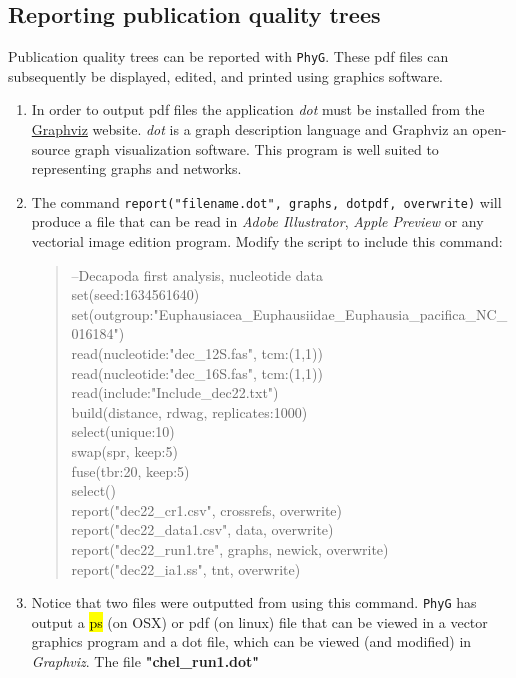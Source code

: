 \documentclass[11pt]{article}
\newcommand{\phyg}{\texttt{PhyG} }
\begin{document}
\subsection{Reporting publication quality trees}
\label{subsec:dotpdf}

Publication quality trees can be reported with \texttt{PhyG}. These pdf files can  
subsequently be displayed, edited, and printed using graphics software.

\begin{enumerate}

\item In order to output pdf files the application \emph{dot} must be installed from 
the \href{https://graphviz.org/download/}{Graphviz} website. \emph{dot} is a graph 
description language and Graphviz an  open-source graph visualization software. 
This program is well suited to representing graphs and networks.

\item  The command \texttt{report("filename.dot", graphs, dotpdf, overwrite)} will 
produce a file that can be read in \emph{Adobe Illustrator}, \emph{Apple Preview} 
or any vectorial image edition program. Modify the script to include this command:

	\begin{quote}	
	--Decapoda first analysis, nucleotide data\\
	set(seed:1634561640)\\
	set(outgroup:"Euphausiacea\_Euphausiidae\_Euphausia\_pacifica\_NC\_016184")\\
	read(nucleotide:"dec\_12S.fas", tcm:(1,1))\\
	read(nucleotide:"dec\_16S.fas", tcm:(1,1))\\
	read(include:"Include\_dec22.txt")\\
	build(distance, rdwag, replicates:1000)\\
	select(unique:10)\\
	swap(spr, keep:5)\\
	fuse(tbr:20, keep:5)\\
	select()\\
	report("dec22\_cr1.csv", crossrefs, overwrite)\\
	report("dec22\_data1.csv", data, overwrite)\\
	report("dec22\_run1.tre", graphs, newick, overwrite)
	report("dec22\_ia1.ss", tnt, overwrite)
	\end{quote}
	
\item Notice that two files were outputted from using this command. \phyg has 
output a \hl{ps} (on OSX) or pdf (on linux) file that can be viewed in a vector graphics 
program and a dot file, which can be viewed (and modified) in \emph{Graphviz}.
The file \textbf{"chel\_run1.dot"} 
\end{enumerate}
\end{document}
